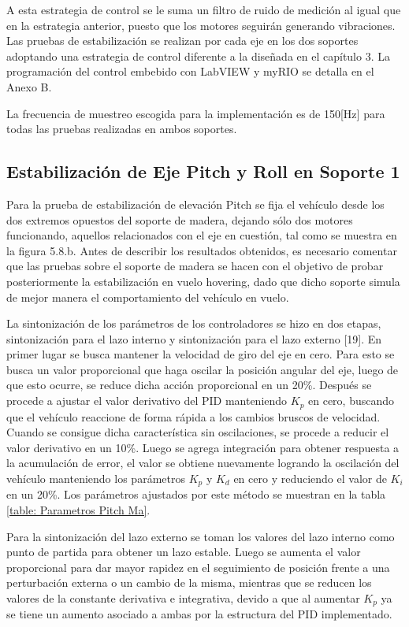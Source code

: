 \documentclass[../main.tex]{subfiles}
\begin{document}
A esta estrategia de control se le suma un filtro de ruido de medición
al igual que en la estrategia anterior, puesto que los motores seguirán
generando vibraciones. Las pruebas de estabilización se realizan por
cada eje en los dos soportes adoptando una estrategia de control
diferente a la diseñada en el capítulo 3. La programación
del control embebido con LabVIEW y myRIO se detalla en el Anexo B.

La frecuencia de muestreo escogida para la implementación es de 150[Hz] para todas las pruebas realizadas en ambos soportes.

\subsection{Estabilización de Eje Pitch y Roll en Soporte 1}

Para la prueba de estabilización de elevación Pitch se fija el vehículo desde los
dos extremos opuestos del soporte de madera, dejando sólo dos motores
funcionando, aquellos relacionados con el eje en cuestión, tal como se muestra en la figura 5.8.b. Antes de
describir los resultados obtenidos, es necesario comentar que las
pruebas sobre el soporte de madera se hacen con el objetivo de
probar posteriormente la estabilización en vuelo hovering, dado que
dicho soporte simula de mejor manera el comportamiento del vehículo
en vuelo. 

La sintonización de los parámetros de los controladores se hizo en
dos etapas, sintonización para el lazo interno y sintonización para
el lazo externo [19]. En primer lugar se busca mantener la velocidad de
giro del eje en cero. Para esto se busca un valor proporcional que
haga oscilar la posición angular del eje, luego de que esto ocurre,
se reduce dicha acción proporcional en un 20\%. Después se procede
a ajustar el valor derivativo del PID manteniendo $K_{p}$ en cero,
buscando que el vehículo reaccione de forma rápida a los cambios bruscos
de velocidad. Cuando se consigue dicha característica sin oscilaciones,
se procede a reducir el valor derivativo en un 10\%. Luego se agrega
integración para obtener respuesta a la acumulación de error, el valor
se obtiene nuevamente logrando la oscilación del vehículo manteniendo
los parámetros $K_{p}$ y $K_{d}$ en cero y reduciendo el valor de
$K_{i}$ en un 20\%. Los parámetros ajustados por este método se muestran en la tabla \ref{table: Parametros Pitch Ma}.

Para la sintonización del lazo externo se toman los valores del lazo
interno como punto de partida para obtener un lazo estable. Luego
se aumenta el valor proporcional para dar mayor rapidez en el seguimiento
de posición frente a una perturbación externa o un cambio de la misma,
mientras que se reducen los valores de la constante derivativa e integrativa,
devido a que al aumentar $K_{p}$ ya se tiene un aumento asociado
a ambas por la estructura del PID implementado.
\end{document}
